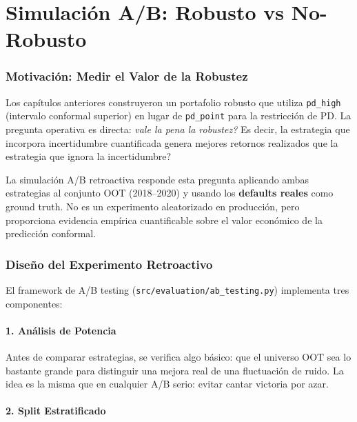 \documentclass[
  spanish,
  11pt,
  letterpaper,
]{scrbook}
\theoremstyle{plain}
\theoremstyle{remark}
\begin{document}
\chapter{Simulación A/B: Robusto vs No-Robusto}\label{sec-ab-testing}

\subsection{Motivación: Medir el Valor de la
Robustez}\label{motivaciuxf3n-medir-el-valor-de-la-robustez}

Los capítulos anteriores construyeron un portafolio robusto que utiliza
\texttt{pd\_high} (intervalo conformal superior) en lugar de
\texttt{pd\_point} para la restricción de PD. La pregunta operativa es
directa: \emph{vale la pena la robustez?} Es decir, la estrategia que
incorpora incertidumbre cuantificada genera mejores retornos realizados
que la estrategia que ignora la incertidumbre?

La simulación A/B retroactiva responde esta pregunta aplicando ambas
estrategias al conjunto OOT (2018--2020) y usando los \textbf{defaults
reales} como ground truth. No es un experimento aleatorizado en
producción, pero proporciona evidencia empírica cuantificable sobre el
valor económico de la predicción conformal.

\subsection{Diseño del Experimento
Retroactivo}\label{diseuxf1o-del-experimento-retroactivo}

El framework de A/B testing (\texttt{src/evaluation/ab\_testing.py})
implementa tres componentes:

\subsubsection{1. Análisis de Potencia}\label{anuxe1lisis-de-potencia}

Antes de comparar estrategias, se verifica algo básico: que el universo
OOT sea lo bastante grande para distinguir una mejora real de una
fluctuación de ruido. La idea es la misma que en cualquier A/B serio:
evitar cantar victoria por azar.

\subsubsection{2. Split Estratificado}\label{split-estratificado}
\end{document}
